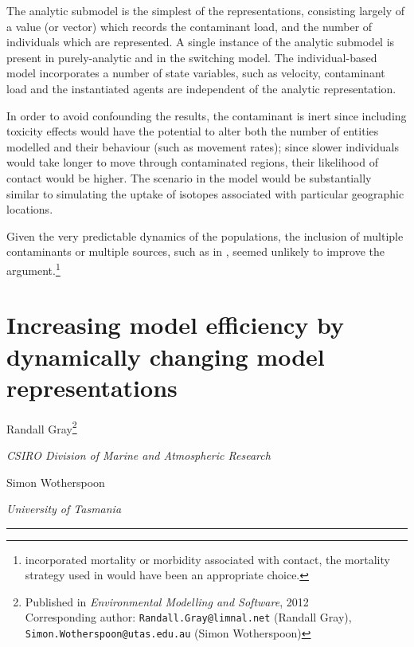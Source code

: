 The analytic submodel is the simplest of the representations,
consisting largely of a value (or vector) which records the
contaminant load, and the number of individuals which are represented.
A single instance of the analytic submodel is present in
purely-analytic and in the switching model.  The individual-based
model incorporates a number of state variables, such as velocity,
contaminant load and the instantiated agents are independent of the
analytic representation.

In order to avoid confounding the results, the contaminant is inert
since including toxicity effects would have the potential to alter
both the number of entities modelled and their behaviour (such as
movement rates); since slower individuals would take longer to move
through contaminated regions, their likelihood of contact would be
higher.  The scenario in the model would be substantially similar to
simulating the uptake of isotopes associated with particular geographic
locations.

Given the very predictable dynamics of the populations, the inclusion
of multiple contaminants or multiple sources, such as in
\cite{Gray06:1, Gray2014}, seemed unlikely to improve the
argument.\footnote{incorporated mortality or morbidity
  associated with contact, the mortality strategy used in
  \citet{GrayNingaloo} would have been an appropriate choice.}

\pagebreak

\section*{Increasing model efficiency by dynamically changing model representations}
\begin{center}
    Randall Gray\footnote{
     {Published in \emph{Environmental Modelling and Software}, 2012}\\
       Corresponding author:
      \texttt{Randall.Gray@limnal.net} (Randall Gray),\\
      \texttt{Simon.Wotherspoon@utas.edu.au} (Simon Wotherspoon)
    }

    \emph{CSIRO Division of Marine and Atmospheric Research}

    Simon Wotherspoon 

    \emph{University of Tasmania}
\end{center}

\rule{\textwidth}{2pt}

